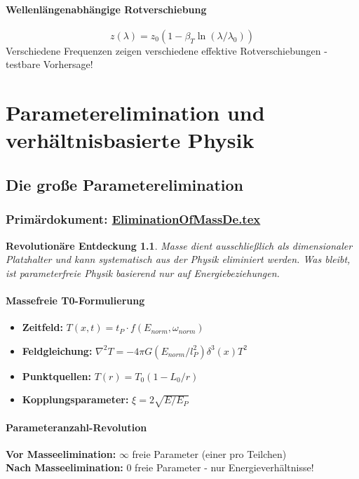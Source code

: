 \documentclass[12pt,a4paper]{report}
\newtheorem{discovery}{Revolutionäre Entdeckung}[chapter]
\begin{document}
	\subsubsection{Wellenlängenabhängige Rotverschiebung}
	$$z(\lambda) = z_0(1 - \beta_T \ln(\lambda/\lambda_0))$$
	Verschiedene Frequenzen zeigen verschiedene effektive Rotverschiebungen - testbare Vorhersage!
	
	\chapter{Parameterelimination und verhältnisbasierte Physik}
	
	\section{Die große Parameterelimination}
	\subsection{Primärdokument: \href{https://github.com/jpascher/T0-Time-Mass-Duality/tree/main/2/pdf/EliminationOfMassDe.pdf}{EliminationOfMassDe.tex}}
	
	\begin{discovery}
		Masse dient ausschließlich als dimensionaler Platzhalter und kann systematisch aus der Physik eliminiert werden. Was bleibt, ist parameterfreie Physik basierend nur auf Energiebeziehungen.
	\end{discovery}
	
	\subsubsection{Massefreie T0-Formulierung}
	\begin{itemize}
		\item \textbf{Zeitfeld:} $T(x,t) = t_P \cdot f(E_{norm}, \omega_{norm})$
		\item \textbf{Feldgleichung:} $\nabla^2 T = -4\pi G(E_{norm}/l_P^2)\delta^3(x)T^2$
		\item \textbf{Punktquellen:} $T(r) = T_0(1 - L_0/r)$
		\item \textbf{Kopplungsparameter:} $\xi = 2\sqrt{E/E_P}$
	\end{itemize}
	
	\subsubsection{Parameteranzahl-Revolution}
	\textbf{Vor Masseelimination:} $\infty$ freie Parameter (einer pro Teilchen)\\
	\textbf{Nach Masseelimination:} 0 freie Parameter - nur Energieverhältnisse!
	
\end{document}
